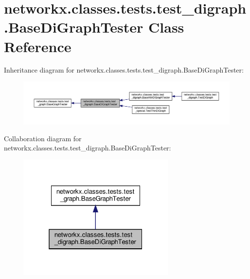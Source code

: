 \hypertarget{classnetworkx_1_1classes_1_1tests_1_1test__digraph_1_1BaseDiGraphTester}{}\section{networkx.\+classes.\+tests.\+test\+\_\+digraph.\+Base\+Di\+Graph\+Tester Class Reference}
\label{classnetworkx_1_1classes_1_1tests_1_1test__digraph_1_1BaseDiGraphTester}


Inheritance diagram for networkx.\+classes.\+tests.\+test\+\_\+digraph.\+Base\+Di\+Graph\+Tester\+:
\nopagebreak
\begin{figure}[H]
\begin{center}
\leavevmode
\includegraphics[width=350pt]{classnetworkx_1_1classes_1_1tests_1_1test__digraph_1_1BaseDiGraphTester__inherit__graph}
\end{center}
\end{figure}


Collaboration diagram for networkx.\+classes.\+tests.\+test\+\_\+digraph.\+Base\+Di\+Graph\+Tester\+:
\nopagebreak
\begin{figure}[H]
\begin{center}
\leavevmode
\includegraphics[width=223pt]{classnetworkx_1_1classes_1_1tests_1_1test__digraph_1_1BaseDiGraphTester__coll__graph}
\end{center}
\end{figure}

